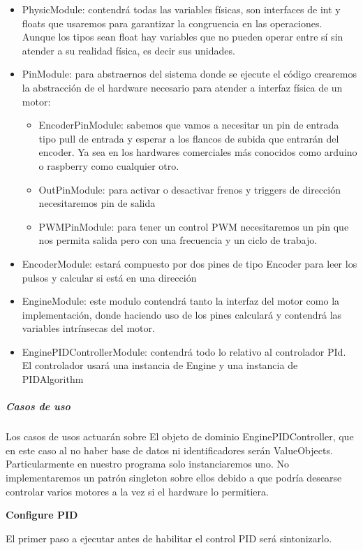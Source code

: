 \begin{itemize}
    \item PhysicModule: contendrá todas las variables físicas, son interfaces de int y floats que usaremos para garantizar la congruencia en las operaciones. Aunque los tipos sean float hay variables que no pueden operar entre sí sin atender a su realidad física, es decir sus unidades.
    \item PinModule: para abstraernos del sistema donde se ejecute el código crearemos la abstracción de el hardware necesario para atender a interfaz física de un motor:
    \begin{itemize}
        \item EncoderPinModule: sabemos que vamos a necesitar un pin de entrada tipo pull de entrada y esperar a los flancos de subida que entrarán del encoder. Ya sea en los hardwares comerciales más conocidos como arduino o raspberry como cualquier otro.
        \item OutPinModule: para activar o desactivar frenos y triggers de dirección necesitaremos pin de salida
        \item PWMPinModule: para tener un control PWM necesitaremos un pin que nos permita salida pero con una frecuencia y un ciclo de trabajo.
    \end{itemize}
    \item EncoderModule: estará compuesto por dos pines de tipo Encoder para leer los pulsos y calcular si está en una dirección
    \item EngineModule: este modulo contendrá tanto la interfaz del motor como la implementación, donde haciendo uso de los pines calculará y contendrá las variables intrínsecas del motor.
    \item EnginePIDControllerModule: contendrá todo lo relativo al controlador PId. El controlador usará una instancia de Engine y una instancia de PIDAlgorithm
\end{itemize}

\subparagraph{Casos de uso}

Los casos de usos actuarán sobre El objeto de dominio EnginePIDController, que en este caso al no haber base de datos ni identificadores serán ValueObjects. Particularmente en nuestro programa solo instanciaremos uno. No implementaremos un patrón singleton sobre ellos debido a que podría desearse controlar varios motores a la vez si el hardware lo permitiera.

\textbf{Configure PID}

El primer paso a ejecutar antes de habilitar el control PID será sintonizarlo.

